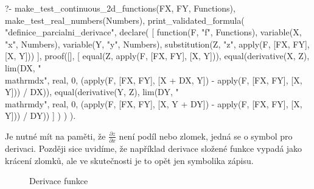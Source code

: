 \begin{prolog}
?-	make_test_continuous_2d_functions(FX, FY, Functions),
	make_test_real_numbers(Numbers),
	print_validated_formula(
		"definice_parcialni_derivace",
		declare(
			[
				function(F, "f", Functions),
				variable(X, "x", Numbers),
				variable(Y, "y", Numbers),
				substitution(Z, "z", apply(F, [FX, FY], [X, Y]))
			],
			proof([],
				[
					equal(Z, apply(F, [FX, FY], [X, Y])),
					equal(derivative(X, Z), lim(DX, "\\mathrm{d}x", real, 0, (apply(F, [FX, FY], [X + DX, Y]) - apply(F, [FX, FY], [X, Y])) / DX)),
					equal(derivative(Y, Z), lim(DY, "\\mathrm{d}y", real, 0, (apply(F, [FX, FY], [X, Y + DY]) - apply(F, [FX, FY], [X, Y])) / DY))
				]
			)
		)
	).
\end{prolog}

Je nutné mít na paměti, že \(\frac{\partial z}{\partial x}\) není podíl nebo zlomek, jedná se o symbol pro derivaci. Později sice uvidíme, že například derivace složené funkce vypadá jako krácení zlomků, ale ve skutečnosti je to opět jen symbolika zápisu.

\begin{figure}
\begin{center}
\caption{Derivace funkce}
\end{center}
\label{img:derivace}
\end{figure}

